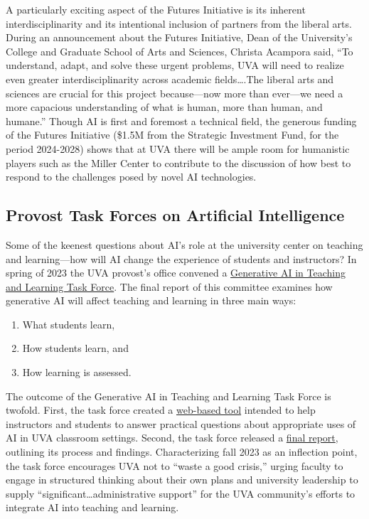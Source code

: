 \documentclass[12pt, oneside]{article}   	%
\begin{document}
A particularly exciting aspect of the Futures Initiative is its inherent interdisciplinarity and its intentional inclusion of partners from the liberal arts.  During an announcement about the Futures Initiative, Dean of the University’s College and Graduate School of Arts and Sciences, Christa Acampora said, “To understand, adapt, and solve these urgent problems, UVA will need to realize even greater interdisciplinarity across academic fields….The liberal arts and sciences are crucial for this project because—now more than ever—we need a more capacious understanding of what is human, more than human, and humane.”  Though AI is first and foremost a technical field, the generous funding of the Futures Initiative (\$1.5M from the Strategic Investment Fund, for the period 2024-2028) shows that at UVA there will be ample room for humanistic players such as the Miller Center to contribute to the discussion of how best to respond to the challenges posed by novel AI technologies.


\subsection{Provost Task Forces on Artificial Intelligence}
Some of the keenest questions about AI’s role at the university center on teaching and learning—how will AI change the experience of students and instructors?  In spring of 2023 the UVA provost’s office convened a \href{https://provost.virginia.edu/subsite/genai}{Generative AI in Teaching and Learning Task Force}.  The final report of this committee examines how generative AI will affect teaching and learning in three main ways:
\begin{enumerate}
\item What students learn,
\item How students learn, and
\item How learning is assessed.
\end{enumerate}
The outcome of the Generative AI in Teaching and Learning Task Force is twofold.  First, the task force created a \href{https://provost.virginia.edu/subsite/genai/faqs}{web-based tool} intended to help instructors and students to answer practical questions about appropriate uses of AI in UVA classroom settings.  Second, the task force released a \href{https://provost.virginia.edu/subsite/genai/task-force-report}{final report}, outlining its process and findings.  Characterizing fall 2023 as an inflection point, the task force encourages UVA not to “waste a good crisis,” urging faculty to engage in structured thinking about their own plans and university leadership to supply “significant…administrative support” for the UVA community’s efforts to integrate AI into teaching and learning.
\end{document}
